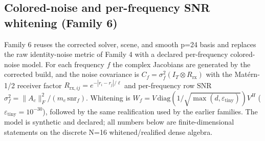 \documentclass[12pt]{article}
\begin{document}
\subsection{Colored-noise and per-frequency SNR whitening (Family 6)}\label{sec:family6}

Family 6 reuses the corrected solver, scene, and smooth p=24 basis and
replaces the raw identity-noise metric of Family 4 with a declared
per-frequency colored-noise model. For each frequency $f$ the complex
Jacobians are generated by the corrected build, and the noise covariance is
$C_f=\sigma_f^2(I_T\otimes R_{\mathrm{rx}})$ with the Mat\'ern-1/2 receiver
factor $R_{\mathrm{rx},ij}=e^{-|r_i-r_j|/\ell}$ and per-frequency row SNR
$\sigma_f^2=\|A_c\|_F^2/(m_c\,\mathrm{snr}_f)$. Whitening is
$W_f=V\,\mathrm{diag}(1/\sqrt{\max(d,\varepsilon_{\mathrm{tiny}})})V^H$
($\varepsilon_{\mathrm{tiny}}=10^{-30}$), followed by the same
realification used by the earlier families. The model is synthetic and
declared; all numbers below are finite-dimensional statements on the discrete
N=16 whitened/realified dense algebra.
\end{document}

